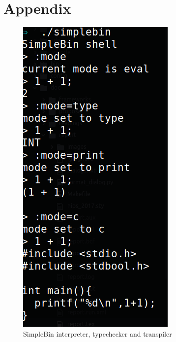 \documentclass{article}
\begin{document}
\printbibliography

\section*{Appendix}
\label{sec:appendix}

\begin{figure}[h]
    \centering
    \includegraphics[width=0.5\columnwidth]{simplebin}
    \caption{SimpleBin interpreter, typechecker and transpiler}
    \label{fig:simplebin}
\end{figure}
\end{document}
